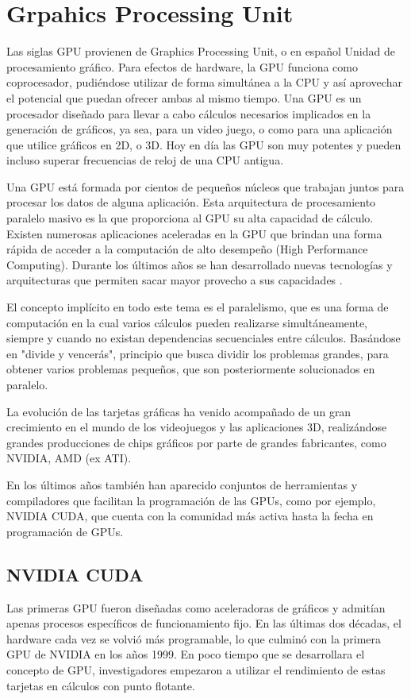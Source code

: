 \section{Grpahics Processing Unit}
Las siglas GPU provienen de Graphics Processing Unit, o en español Unidad de procesamiento gráfico. Para efectos de hardware, la GPU funciona como coprocesador,
pudiéndose utilizar de forma simultánea a la CPU y así aprovechar el potencial que puedan ofrecer ambas al mismo tiempo. Una GPU es un procesador
diseñado para llevar a cabo cálculos necesarios implicados en la generación de gráficos, ya sea, para un video juego, o como para una aplicación que utilice
gráficos en 2D, o 3D. Hoy en día las GPU son muy potentes y pueden incluso superar frecuencias de reloj de una CPU antigua.

Una GPU está formada por cientos de pequeños núcleos que trabajan juntos para procesar los datos de alguna aplicación. Esta arquitectura de procesamiento paralelo
masivo es la que proporciona al GPU su alta capacidad de cálculo. Existen numerosas aplicaciones aceleradas en la GPU que brindan una forma rápida de acceder
a la computación de alto desempeño (High Performance Computing). Durante los últimos años se han desarrollado nuevas tecnologías y arquitecturas
que permiten sacar mayor provecho a sus capacidades \cite{owens2007gpu}.

El concepto implícito en todo este tema es el paralelismo, que es una forma de computación en la cual varios cálculos pueden realizarse simultáneamente,
siempre y cuando no existan dependencias secuenciales entre cálculos. Basándose en "divide y vencerás", principio que busca dividir los problemas grandes, para
obtener varios problemas pequeños, que son posteriormente solucionados en paralelo.

La evolución de las tarjetas gráficas ha venido acompañado de un gran crecimiento en el mundo de los videojuegos y las aplicaciones 3D, realizándose grandes
producciones de chips gráficos por parte de grandes fabricantes, como NVIDIA, AMD (ex ATI).

En los últimos años también han aparecido conjuntos de herramientas y compiladores que facilitan la programación de las GPUs, como por ejemplo, NVIDIA CUDA, que
cuenta con la comunidad más activa hasta la fecha en programación de GPUs.

\subsection{NVIDIA CUDA}
Las primeras GPU fueron diseñadas como aceleradoras de gráficos y admitían apenas procesos específicos de funcionamiento fijo. En las últimas dos décadas,
el hardware cada vez se volvió más programable, lo que culminó con la primera GPU de NVIDIA en los años 1999. En poco tiempo que se desarrollara el concepto de GPU,
investigadores empezaron a utilizar el rendimiento de estas tarjetas en cálculos con punto flotante.

